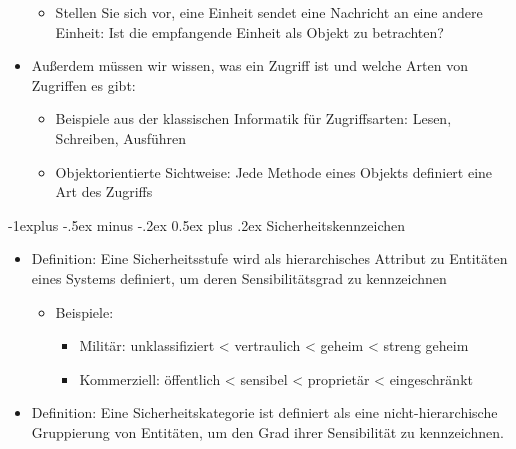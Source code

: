 \documentclass[a4paper]{article}
\makeatletter
\renewcommand{\subsection}{\@startsection{subsection}{2}{0mm}%
 {-1explus -.5ex minus -.2ex}%
 {0.5ex plus .2ex}%
 {\normalfont\normalsize\bfseries}}
\makeatother
\begin{document}
\begin{multicols}{3}
\begin{itemize}
              \begin{itemize}
                  \item
                        Stellen Sie sich vor, eine Einheit sendet eine Nachricht an eine
                        andere Einheit: Ist die empfangende Einheit als Objekt zu
                        betrachten?
              \end{itemize}
        \item
              Außerdem müssen wir wissen, was ein Zugriff ist und welche Arten von
              Zugriffen es gibt:

              \begin{itemize}
                  \item
                        Beispiele aus der klassischen Informatik für Zugriffsarten: Lesen,
                        Schreiben, Ausführen
                  \item
                        Objektorientierte Sichtweise: Jede Methode eines Objekts definiert
                        eine Art des Zugriffs
              \end{itemize}
    \end{itemize}


    \subsection{Sicherheitskennzeichen}

    \begin{itemize}
        \item
              Definition: Eine Sicherheitsstufe wird als hierarchisches Attribut zu
              Entitäten eines Systems definiert, um deren Sensibilitätsgrad zu
              kennzeichnen

              \begin{itemize}
                  \item
                        Beispiele:

                        \begin{itemize}
                            \item
                                  Militär: unklassifiziert \textless{} vertraulich \textless{}
                                  geheim \textless{} streng geheim
                            \item
                                  Kommerziell: öffentlich \textless{} sensibel \textless{}
                                  proprietär \textless{} eingeschränkt
                        \end{itemize}
              \end{itemize}
        \item
              Definition: Eine Sicherheitskategorie ist definiert als eine
              nicht-hierarchische Gruppierung von Entitäten, um den Grad ihrer
              Sensibilität zu kennzeichnen.


\end{itemize}
\end{multicols}
\end{document}
